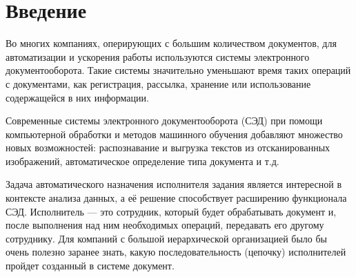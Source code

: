 \documentclass[14pt]{matmex-diploma-custom}
\begin{document}
\maketitle
\tableofcontents
\section*{Введение}
Во многих компаниях, оперирующих с большим количеством документов, для автоматизации и ускорения работы используются системы электронного документооборота. Такие системы значительно уменьшают время таких операций с документами, как регистрация, рассылка, хранение или использование содержащейся в них информации.

Современные системы электронного документооборота (СЭД) при помощи компьютерной обработки и методов машинного обучения добавляют множество новых возможностей: распознавание и выгрузка текстов из отсканированных изображений, автоматическое определение типа документа и т.д.

Задача автоматического назначения исполнителя задания является интересной в контексте анализа данных, а её решение способствует расширению функционала СЭД. Исполнитель --- это сотрудник, который будет обрабатывать документ и, после выполнения над ним необходимых операций, передавать его другому сотруднику. Для компаний с большой иерархической организацией было бы очень полезно заранее знать, какую последовательность (цепочку) исполнителей пройдет созданный в системе документ.
\end{document}
